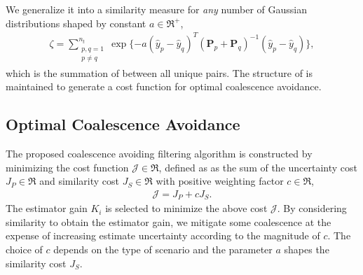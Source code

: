 We generalize it into a similarity measure for \emph{any} number of Gaussian distributions shaped by constant $a\in\Re^+$,%
\begin{align}
\label{eqn:zetaGeneral}
\zeta=\sum\limits_{\substack{p,q=1\\p\neq q}}^{n_t} \exp \{-a(\hat y_{p}- \hat y_{q})^T({\mathbf P}_{p}
+{\mathbf P}_{q})^{-1}(\hat y_{p}-\hat y_{q})\},
\end{align}
which is the summation of  between all unique pairs.
The structure of  is maintained to generate a cost function for optimal coalescence avoidance.

	
\subsection{Optimal Coalescence Avoidance}


The proposed coalescence avoiding filtering algorithm is constructed by minimizing the cost function $\mathcal{J}\in\Re$, defined as as the sum of the uncertainty cost $J_P\in\Re$ and similarity cost $J_S\in\Re$ with positive weighting factor $c\in\Re$,
\begin{align}
\label{eqn:CostGen}
\mathcal{J}=J_P+cJ_S.
\end{align}
The estimator gain $K_i$ is selected to minimize the above cost $\mathcal{J}$. By considering similarity to obtain the estimator gain, we mitigate some coalescence at the expense of increasing estimate uncertainty according to the magnitude of $c$.
The choice of $c$ depends on the type of scenario and the parameter $a$ shapes the similarity cost $J_S$.



